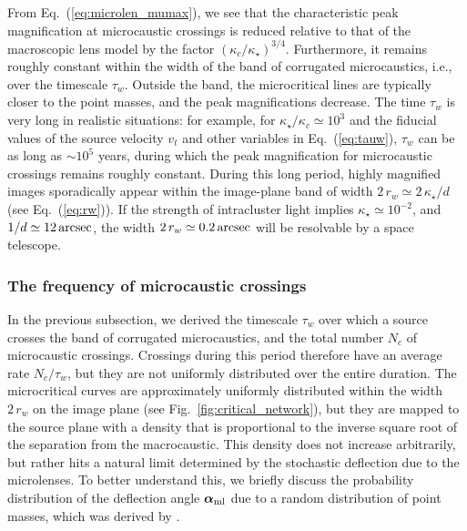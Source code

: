 \documentclass{aastex6}
\newcommand{\refeq}[1]{Eq.~(\ref{eq:#1})}
\newcommand{\reffig}[1]{Fig.~\ref{fig:#1}}
\begin{document}
From \refeq{microlen_mumax}, we see that the characteristic peak magnification at microcaustic crossings is reduced relative to that of the macroscopic lens model by the factor $(\kappa_c/\kappa_\star)^{3/4}$. Furthermore, it remains roughly constant
within the width of the band of corrugated microcaustics, i.e., over the timescale $\tau_w$. Outside the band, the microcritical lines are typically closer to the point masses, and the peak magnifications decrease. The time $\tau_w$ is very long in realistic situations: for example, for $\kappa_\star/\kappa_c \simeq 10^3$ and the fiducial values of the source velocity $v_t$ and other variables in \refeq{tauw}, $\tau_w$ can be as long as $\sim 10^5$ years, during which the peak magnification for microcaustic crossings remains roughly constant. During this long period, highly magnified images sporadically appear within the image-plane band of width $2\, r_w \simeq 2\, \kappa_\star/d$ (see \refeq{rw}). If the strength of intracluster light implies $\kappa_\star \simeq 10^{-2}$, and $1/d \simeq 12\, {\rm arcsec}$, the width $2\, r_w\simeq 0.2\, {\rm arcsec}$ will be resolvable by a space telescope.

\subsubsection{The frequency of microcaustic crossings}
\label{sec:freqc}

In the previous subsection, we derived the timescale $\tau_w$ over which a source crosses the band of corrugated microcaustics, and the total number $N_c$ of microcaustic crossings. Crossings during this period therefore have an average rate $N_c/\tau_w$, but they are not uniformly distributed over the entire duration. The microcritical curves are approximately uniformly distributed within the width $2\,r_w$ on the image plane (see \reffig{critical_network}), but they are mapped to the source plane with a density that is proportional to the inverse square root of the separation from the macrocaustic. This density does not increase arbitrarily, but rather hits a natural limit determined by the stochastic deflection due to the microlenses. To better understand this, we briefly discuss the probability distribution of the deflection angle $\bm{\alpha}_{\rm ml}$ due to a random distribution of point masses, which was derived by \cite{1986ApJ...306....2K}.
\end{document}

